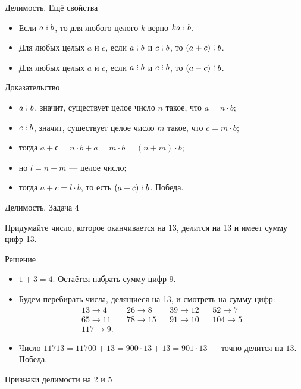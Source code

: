 \documentclass[17pt]{extarticle}
\newcommand{\divsby}{\mathrel{\rlap{.}\rlap{\raisebox{0.55ex}{.}}\raisebox{1.1ex}{.}}}
\newcommand{\newslide}[1]{\newpage \begin{center} \large #1 \end{center}}
\begin{document}
\newslide{Делимость. Ещё свойства}
\begin{itemize}
\item Если $a \divsby b$, то для любого целого $k$ верно $ka \divsby b$.
\item Для любых целых $a$ и $c$, если $a \divsby b$ и $c \divsby b$, то $(a + c) \divsby b$.
\item Для любых целых $a$ и $c$, если $a \divsby b$ и $c \divsby b$, то $(a - c) \divsby b$.
\end{itemize}

\newslide{Доказательство}\vspace{-7mm}

\begin{itemize}\itemsep=0mm
\item $a \divsby b$, значит, существует целое число $n$ такое, что $a = n\cdot b$;
\item $c \divsby b$, значит, существует целое число $m$ такое, что $c = m\cdot b$;
\item тогда $a+с = n\cdot b + a = m\cdot b = (n+m)\cdot b$;
\item но $l =n+m$ --- целое число;
\item тогда $a+c = l\cdot b$, то есть $(a+c) \divsby b$. Победа.
\end{itemize}

\newslide{Делимость. Задача 4}

Придумайте число, которое оканчивается на 13, делится на 13 и имеет сумму цифр 13.

\newslide{Решение}\vspace{-10mm}

\begin{itemize}\itemsep=-1mm
\item $1+3 = 4$. Остаётся набрать сумму цифр 9.
\item Будем перебирать числа, делящиеся на 13, и смотреть на сумму цифр:\vspace{-1mm}
\begin{align*}
13 \to 4 && 26\to 8 && 39 \to 12 && 52 \to 7\\
65 \to 11 && 78 \to 15 && 91 \to 10 && 104 \to 5\\
117 \to 9.
\end{align*}\vspace{-9mm}
\item Число $11713 = 11700 + 13 = 900\cdot13 + 13 = 901\cdot13$ --- точно делится на $13$. Победа.
\end{itemize}

\newslide{Признаки делимости на 2 и 5}\vspace{-7mm}
\end{document}
